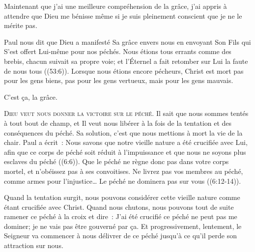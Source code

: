 
Maintenant que j'ai une meilleure compréhension de la grâce,
 j'ai appris à attendre que Dieu me bénisse même si je suis pleinement
 conscient que je ne le mérite pas.

Paul nous dit que Dieu a manifesté Sa grâce envers nous en envoyant Son Fils
 qui S'est offert Lui-même pour nos péchés.
 \og Nous étions tous errants comme des brebis, chacun suivait sa propre voie;
 et l'Éternel a fait retomber sur Lui la faute de nous tous \fg{}
 ((53:6)).
 Lorsque nous étions encore pécheurs, Christ est mort
 \ocadr pas pour les gens biens, pas pour les gens vertueux,
 mais pour les gens mauvais.

C'est ça,  la grâce.

\dvrule






\lettrine{D}{ieu veut nous donner la victoire sur le péché.}
 Il sait que nous sommes tentés à tout bout de champ,
 et Il veut nous libérer à la fois de la tentation et des conséquences
 du péché. Sa solution, c'est que nous mettions à mort la vie de la chair.
 Paul a écrit~: 
 \og Nous savons que notre vieille nature a été crucifiée avec Lui,
 afin que ce corps de péché soit réduit à l'impuissance
 et que nous ne soyons plus esclaves du péché \fg{} ((6:6)).
 \og Que le péché ne règne donc pas dans votre corps mortel,
 et n'obéissez pas à ses convoitises. Ne livrez pas vos membres au péché,
 comme armes pour l'injustice\dots{}
 Le péché ne dominera pas sur vous \fg{} ((6:12-14)).


Quand la tentation surgit, nous pouvons considérer cette vieille nature
 comme étant crucifiée avec Christ. Quand nous chutons, nous pouvons
 tout de suite ramener ce péché à la croix et dire~: 
 \og J'ai été crucifié \ocadr ce péché ne peut pas me dominer;
 je ne vais pas être gouverné par ça. \fg{}
 Et progressivement, lentement, le Seigneur va commencer à nous délivrer
 de ce péché jusqu'à ce qu'il perde son attraction sur nous.

